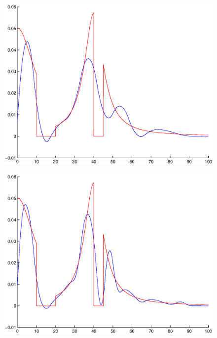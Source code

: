 \documentclass[A4paper,11pt]{article}
\theoremstyle{definition}
\begin{document}
\begin{figure}[H]
\centering
\begin{minipage}{.33\textwidth}
  \centering
  \vspace{0.22cm}
  \includegraphics[scale=0.25]{pictures/Example9/Fig2.eps}
  \label{fig:9_2}
\end{minipage}%
\begin{minipage}{.33\textwidth}
  \centering
  \vspace{0.2cm}
  \includegraphics[scale=0.25]{pictures/Example9/Fig3.eps}
  \label{fig:9_3}
\end{minipage}%
\begin{minipage}{.33\textwidth}
  \centering

\end{minipage}
\end{figure}
\end{document}
